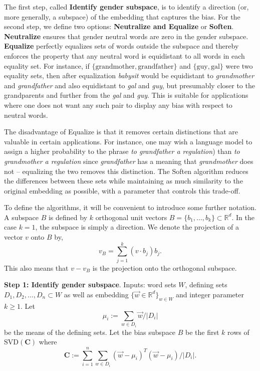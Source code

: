 \documentclass{article}
\begin{document}
The first step, called {\bf Identify gender subspace}, is to identify a direction (or, more generally, a subspace) of the embedding that captures the bias. For the second step, we define two options: {\bf Neutralize and Equalize} or {\bf Soften}. {\bf Neutralize} ensures that gender neutral words are zero in the gender subspace. {\bf Equalize} perfectly equalizes sets of words outside the subspace and thereby enforces the property that any neutral word is equidistant to all words in each equality set. For instance, if $\{\text{grandmother}, \text{grandfather}\}$ and $\{\text{guy}, \text{gal}\}$ were two equality sets, then after equalization {\em babysit} would be equidistant to {\em grandmother} and {\em grandfather} and also equidistant to {\em gal} and {\em guy}, but presumably closer to the grandparents and further from the {\em gal} and {\em guy}. This is suitable for applications where one does not want any such pair to display any bias with respect to neutral words. 

The disadvantage of Equalize is that it removes certain distinctions that are valuable in certain applications. For instance, one may wish a language model to assign a higher probability to the phrase {\em to grandfather a regulation}) than {\em to grandmother a regulation} since {\em grandfather} has a meaning that {\em grandmother} does not -- equalizing the two removes this distinction. The Soften algorithm reduces the differences between these sets while maintaining as much similarity to the original embedding as possible, with a parameter that controls this trade-off. 

To define the algorithms, it will be convenient to introduce some further notation. A subspace $B$ is defined by $k$ orthogonal unit vectors $B = \{b_1, \ldots, b_k\} \subset \mathbb{R}^d$. In the case $k=1$, the subspace is simply a direction. We denote the projection of a vector $v$ onto $B$ by,
$$v_B = \sum_{j=1}^k (v \cdot b_j) b_j.$$
This also means that $v-v_B$ is the projection onto the orthogonal subspace.

\smallskip
\noindent
{\bf Step 1: Identify gender subspace}. Inputs: word sets $W$,  defining sets $D_1, D_2, \ldots, D_n \subset W$ as well as embedding $\bigr\{\vec{w} \in \mathbb{R}^d\bigl\}_{w \in W}$ and integer parameter $k \geq 1$. Let $$\mu_i := \sum_{w \in D_i} \vec{w}/|D_i|$$ be the means of the defining sets. Let the bias subspace $B$ be the first $k$ rows of $\mathrm{SVD}(\textbf{C})$ where $$\textbf{C} := \sum_{i=1}^n \sum_{w \in D_i} (\vec{w}-\mu_i)^T (\vec{w}-\mu_i)\bigl/|D_i|.$$ 
\end{document}
